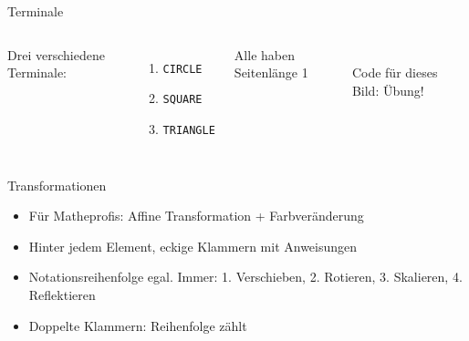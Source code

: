 \documentclass{beamer}
\theoremstyle{example}
\begin{document}
\begin{frame}{Terminale}
\begin{columns}
\column{4cm}
  Drei verschiedene Terminale:
  \begin{enumerate}
  \item \lstinline!CIRCLE!
  \item \lstinline!SQUARE!
  \item \lstinline!TRIANGLE!
  \end{enumerate}
 Alle haben Seitenlänge 1
\column{6cm}
\begin{center}
\\\bigskip
Code für dieses Bild: Übung!
\end{center}

\end{columns}
\end{frame}

\begin{frame}{Transformationen}
  \begin{itemize}
  \item Für Matheprofis: Affine Transformation + Farbveränderung
  \item Hinter jedem Element, eckige Klammern mit Anweisungen
  \item Notationsreihenfolge egal. Immer: 1. Verschieben, 2. Rotieren, 3. Skalieren, 4. Reflektieren
  \item Doppelte Klammern: Reihenfolge zählt
  \end{itemize}
\end{frame}
\end{document}
